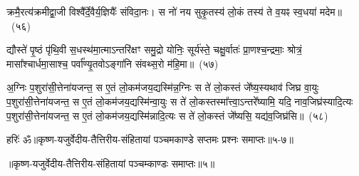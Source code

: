 क्रमै॒रत्य॑क्रमीद्वा॒जी विश्वै᳚र्दे॒वैर्य॒ज्ञियैः᳚ संविदा॒नः। स नो॑ नय सुकृ॒तस्य॑ लो॒कं तस्य॑ ते व॒यꣴ स्व॒धया॑ मदेम॥~(५६)\ip

{\anuvakamend[{क्रमै॑र॒ष्टाद॑श}]}%

द्यौस्ते॑ पृ॒ष्ठं पृ॑थि॒वी स॒धस्थ॑मा॒त्माऽन्तरि॑क्षꣳ समु॒द्रो योनिः॒ सूर्य॑स्ते॒ चक्षु॒र्वातः॑ प्रा॒णश्च॒न्द्रमाः॒ श्रोत्रं॒ मासा᳚श्चार्धमा॒साश्च॒ पर्वा᳚ण्यृ॒तवो\-ऽङ्गा॑नि संवथ्स॒रो म॑हि॒मा॥~(५७)\ip

{\anuvakamend[{द्यौः पञ्च॑विꣳशतिः}]}%

अ॒ग्निः प॒शुरा॑सी॒त्तेना॑यजन्त॒ स ए॒तं लो॒कम॑जय॒द्यस्मि॑न्न॒ग्निः स ते॑ लो॒कस्तं जे᳚ष्य॒स्यथाव॑ जिघ्र वा॒युः प॒शुरा॑सी॒त्तेना॑यजन्त॒ स ए॒तं लो॒कम॑जय॒द्यस्मि॑न्वा॒युः स ते॑ लो॒कस्तस्मा᳚त्त्वा॒\-ऽन्तरे᳚ष्यामि॒ यदि॒ नाव॒जिघ्र॑स्यादि॒त्यः प॒शुरा॑सी॒त्तेना॑यजन्त॒ स ए॒तं लो॒कम॑जय॒द्यस्मि॑न्नादि॒त्यः स ते॑ लो॒कस्तं जे᳚ष्यसि॒ यद्य॑व॒जिघ्र॑सि॥~(५८)\ip

{\anuvakamend[{यस्मि॑न्न॒ष्टौ च॑}]}%

{हरिः॑ ॐ}{॥कृष्ण-यजुर्वेदीय-तैत्तिरीय-संहितायां पञ्चमकाण्डे सप्तमः प्रश्नः समाप्तः॥५-७॥}

\centerline{॥कृष्ण-यजुर्वेदीय-तैत्तिरीय-संहितायां पञ्चम्काण्डः समाप्तः॥५॥}

\medskip

\centerline{\hyperref[sec:startkanda5]{\closesection}}



\kandaend


